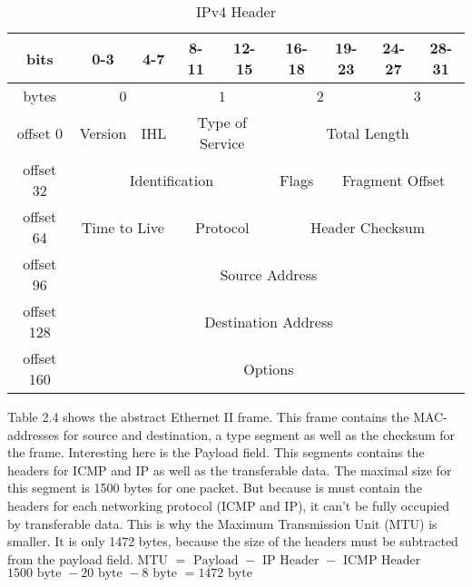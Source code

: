 \begin{table}[H]
	\centering
	\label{ipv4-header}
	\begin{tabular}{|c|c|c|c|c|c|c|c|c|}
		\hline
		bits       & 0-3               & 4-7           & 8-11             & 12-15             & 16-18  & 19-23      & 24-27      & 28-31      \\ \hline
		bytes                            & \multicolumn{2}{c|}{0}                                              & \multicolumn{2}{c|}{1}                                               & \multicolumn{2}{c|}{2}& \multicolumn{2}{c|}{3}\\ \hline
		offset 0   & Version           & IHL           & \multicolumn{2}{c|}{Type of Service} & \multicolumn{4}{c|}{Total Length}             \\ \hline
		offset 32  & \multicolumn{4}{c|}{Identification}                                      & Flags  & \multicolumn{3}{c|}{Fragment Offset} \\ \hline
		offset 64  & \multicolumn{2}{c|}{Time to Live} & \multicolumn{2}{c|}{Protocol}        & \multicolumn{4}{c|}{Header Checksum}          \\ \hline
		offset 96  & \multicolumn{8}{c|}{Source Address}                                                                                      \\ \hline
		offset 128 & \multicolumn{8}{c|}{Destination Address}                                                                                 \\ \hline
		offset 160 & \multicolumn{8}{c|}{Options}                                                                                             \\ \hline
	\end{tabular}
	\caption{IPv4 Header}
\end{table}

Table 2.4 shows the abstract Ethernet II frame. This frame contains the MAC-addresses for source and destination, a type segment as well as the checksum for the frame. Interesting here is the Payload field. This segments contains the headers for ICMP and IP as well as the transferable data. The maximal size for this segment is 1500 bytes for one packet. But because is must contain the headers for each networking protocol (ICMP and IP), it can't be fully occupied by transferable data. This is why the Maximum Transmission Unit (MTU) is smaller. It is only 1472 bytes, because the size of the headers must be subtracted from the payload field.
$ \text{MTU } = \text{ Payload } - \text{ IP Header } - \text{ ICMP Header }$\\
$ 1500\text{ byte } - 20 \text{ byte } - 8 \text{ byte } = 1472 \text{ byte }$

